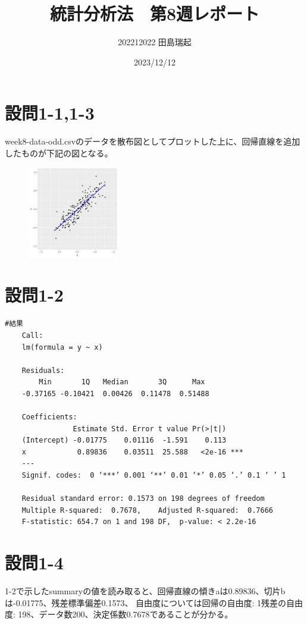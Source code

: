 \documentclass[fontsize = 10pt, paper= a4]{jlreq}
\begin{document}
\title{統計分析法　第8週レポート}
\author{202212022 田島瑞起}
\date{2023/12/12}
\maketitle
\section{設問1-1,1-3}
    week8-data-odd.csvのデータを散布図としてプロットした上に、回帰直線を追加したものが下記の図となる。
    \begin{figure}
        \centering
        \includegraphics[width=4cm]{8-1.png}
    \end{figure}
    

\section{設問1-2}

\begin{lstlisting}[basicstyle=\ttfamily\footnotesize, frame=single]
    #結果
    Call:
    lm(formula = y ~ x)

    Residuals:
        Min       1Q   Median       3Q      Max 
    -0.37165 -0.10421  0.00426  0.11478  0.51488 

    Coefficients:
                Estimate Std. Error t value Pr(>|t|)    
    (Intercept) -0.01775    0.01116  -1.591    0.113    
    x            0.89836    0.03511  25.588   <2e-16 ***
    ---
    Signif. codes:  0 ‘***’ 0.001 ‘**’ 0.01 ‘*’ 0.05 ‘.’ 0.1 ‘ ’ 1

    Residual standard error: 0.1573 on 198 degrees of freedom
    Multiple R-squared:  0.7678,    Adjusted R-squared:  0.7666 
    F-statistic: 654.7 on 1 and 198 DF,  p-value: < 2.2e-16

    \end{lstlisting}

\section{設問1-4}
    1-2で示したsummaryの値を読み取ると、回帰直線の傾きaは0.89836、切片bは-0.01775、残差標準偏差0.1573、
    自由度については回帰の自由度: 1残差の自由度: 198、データ数200、決定係数0.7678であることが分かる。
\end{document}
